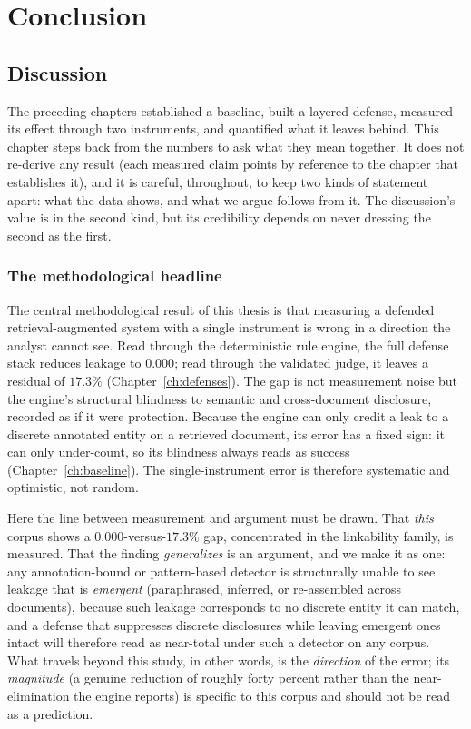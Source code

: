 \documentclass[12pt,a4paper]{report}
\begin{document}
\part{Conclusion}

\chapter{Discussion}
\label{ch:discussion}

The preceding chapters established a baseline, built a layered defense, measured its effect
through two instruments, and quantified what it leaves behind. This chapter steps back from the
numbers to ask what they mean together. It does not re-derive any result (each measured claim
points by reference to the chapter that establishes it), and it is careful, throughout, to
keep two kinds of statement apart: what the data shows, and what we argue follows from it. The
discussion's value is in the second kind, but its credibility depends on never dressing the
second as the first.

\section{The methodological headline}
\label{sec:disc-headline}

The central methodological result of this thesis is that measuring a defended
retrieval-augmented system with a single instrument is wrong in a direction the analyst cannot
see. Read through the deterministic rule engine, the full defense stack reduces leakage to
$0.000$; read through the validated judge, it leaves a residual of $17.3\%$
(Chapter~\ref{ch:defenses}). The gap is not measurement noise but the engine's structural
blindness to semantic and cross-document disclosure, recorded as if it were protection. Because
the engine can only credit a leak to a discrete annotated entity on a retrieved document, its
error has a fixed sign: it can only under-count, so its blindness always reads as success
(Chapter~\ref{ch:baseline}). The single-instrument error is therefore systematic and
optimistic, not random.

Here the line between measurement and argument must be drawn. That \emph{this} corpus shows a
$0.000$-versus-$17.3\%$ gap, concentrated in the linkability family, is measured. That the
finding \emph{generalizes} is an argument, and we make it as one: any
annotation-bound or pattern-based detector is structurally unable to see leakage that is
\emph{emergent} (paraphrased, inferred, or re-assembled across documents), because such
leakage corresponds to no discrete entity it can match, and a defense that suppresses
discrete disclosures while leaving emergent ones intact will therefore read as near-total under
such a detector on any corpus. What travels beyond this study, in other words, is the
\emph{direction} of the error; its \emph{magnitude} (a genuine reduction of roughly forty
percent rather than the near-elimination the engine reports) is specific to this corpus and
should not be read as a prediction.
\end{document}

